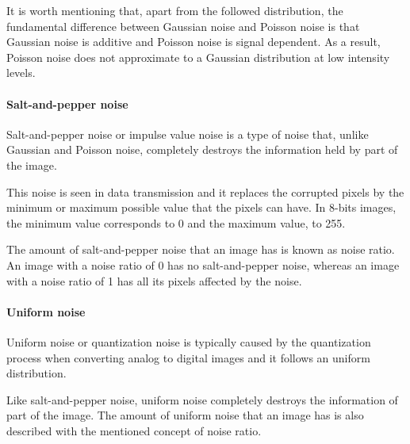 It is worth mentioning that, apart from the followed distribution, the fundamental difference between Gaussian noise and Poisson noise is that Gaussian noise is additive and Poisson noise is signal dependent. As a result, Poisson noise does not approximate to a Gaussian distribution at low intensity levels.

\paragraph{Salt-and-pepper noise}
Salt-and-pepper noise or impulse value noise is a type of noise that, unlike Gaussian and Poisson noise, completely destroys the information held by part of the image. 

This noise is seen in data transmission and it replaces the corrupted pixels by the minimum or maximum possible value that the pixels can have. In 8-bits images, the minimum value corresponds to 0 and the maximum value, to 255.

The amount of salt-and-pepper noise that an image has is known as noise ratio. An image with a noise ratio of 0 has no salt-and-pepper noise, whereas an image with a noise ratio of 1 has all its pixels affected by the noise.

\paragraph{Uniform noise}
Uniform noise or quantization noise is typically caused by the quantization process when converting analog to digital images and it follows an uniform distribution. 

Like salt-and-pepper noise, uniform noise completely destroys the information of part of the image. The amount of uniform noise that an image has is also described with the mentioned concept of noise ratio.

